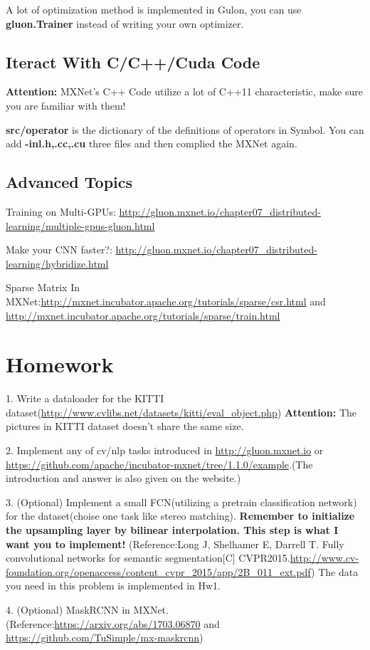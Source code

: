 \documentclass[english]{../TeXTemplate/pkupaper}
\begin{document}
A lot of optimization method is implemented in Gulon, you can use \textbf{gluon.Trainer} instead of writing your own optimizer.



\subsection{Iteract With C/C++/Cuda Code}

\textbf{Attention:} MXNet's C++ Code utilize a lot of C++11 characteristic, make sure you are familiar with them!

\textbf{src/operator} is the dictionary of the definitions of operators in Symbol. You can add \textbf{-inl.h,.cc,.cu} three files and then complied the MXNet again.
\subsection{Advanced Topics}

Training on Multi-GPUs: \url{http://gluon.mxnet.io/chapter07_distributed-learning/multiple-gpus-gluon.html}

Make your CNN faster?: \url{http://gluon.mxnet.io/chapter07_distributed-learning/hybridize.html}

Sparse Matrix In MXNet:\url{http://mxnet.incubator.apache.org/tutorials/sparse/csr.html} and \url{http://mxnet.incubator.apache.org/tutorials/sparse/train.html}


\section{Homework}

1. Write a dataloader for the KITTI dataset(\url{http://www.cvlibs.net/datasets/kitti/eval_object.php}) \textbf{Attention:} The pictures in KITTI dataset doesn't share the same size.

2. Implement any of cv/nlp tasks introduced in \url{http://gluon.mxnet.io} or \url{https://github.com/apache/incubator-mxnet/tree/1.1.0/example}.(The introduction and answer is also given on the website.)

3. (Optional) Implement a small FCN(utilizing a pretrain classification network) for the dataset(choise one task like stereo matching). \textbf{Remember to initialize the upsampling layer by bilinear interpolation. This step is what I want you to implement!} (Reference:Long J, Shelhamer E, Darrell T. Fully convolutional networks for semantic segmentation[C] CVPR2015.\url{http://www.cv-foundation.org/openaccess/content_cvpr_2015/app/2B_011_ext.pdf}) The data you need in this problem is implemented in Hw1.

4. (Optional) MaskRCNN in MXNet. (Reference:\url{https://arxiv.org/abs/1703.06870} and \url{https://github.com/TuSimple/mx-maskrcnn})
\end{document}
